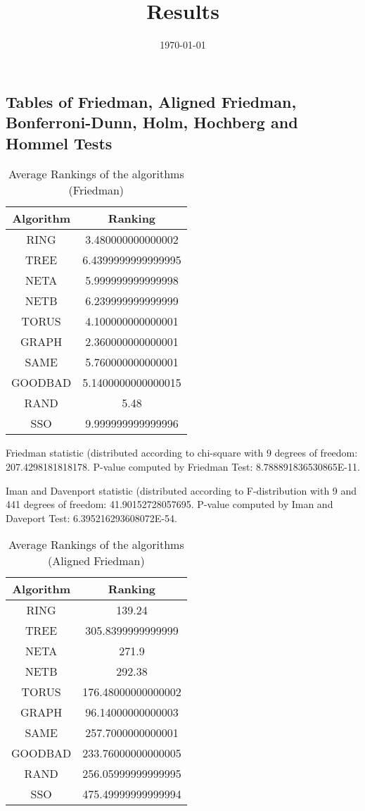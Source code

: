 \documentclass[a4paper,10pt]{article}
\title{Results}
\author{}
\date{\today}
\begin{document}
\begin{landscape}
\oddsidemargin 0in \topmargin 0in\maketitle
\section{Tables of Friedman, Aligned Friedman, Bonferroni-Dunn, Holm, Hochberg and Hommel Tests}
\begin{table}[!htp]
\centering
\caption{Average Rankings of the algorithms (Friedman)
}\begin{tabular}{c|c}
Algorithm&Ranking\\
\hline
 RING&3.480000000000002\\
 TREE&6.4399999999999995\\
 NETA&5.999999999999998\\
 NETB&6.239999999999999\\
 TORUS&4.100000000000001\\
 GRAPH&2.360000000000001\\
 SAME&5.760000000000001\\
 GOODBAD&5.1400000000000015\\
 RAND&5.48\\
 SSO&9.999999999999996\\
\end{tabular}
\end{table}


Friedman statistic (distributed according to chi-square with 9 degrees of freedom: 207.4298181818178. 
P-value computed by Friedman Test: 8.788891836530865E-11.\newline

Iman and Davenport statistic (distributed according to F-distribution with 9 and 441 degrees of freedom: 41.90152728057695. 
P-value computed by Iman and Daveport Test: 6.395216293608072E-54.\newline


\newpage

\begin{table}[!htp]
\centering
\caption{Average Rankings of the algorithms (Aligned Friedman)
}\begin{tabular}{c|c}
Algorithm&Ranking\\
\hline
 RING&139.24\\
 TREE&305.8399999999999\\
 NETA&271.9\\
 NETB&292.38\\
 TORUS&176.48000000000002\\
 GRAPH&96.14000000000003\\
 SAME&257.7000000000001\\
 GOODBAD&233.76000000000005\\
 RAND&256.05999999999995\\
 SSO&475.49999999999994\\
\end{tabular}
\end{table}



\end{landscape}
\end{document}
